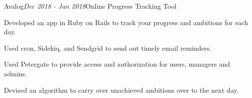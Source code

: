 \begin{rSubsection}{Avalog}{\em Dec 2018 - Jan 2018}{Online Progress Tracking Tool}{}
    \item Developed an app in Ruby on Rails to track your progress and ambitions for each day.
    \item Used cron, Sidekiq, and Sendgrid to send out timely email reminders.
    \item Used Petergate to provide access and authorization for users, managers and admins.
    \item Devised an algorithm to carry over unachieved ambitions over to the next day.
\end{rSubsection}
